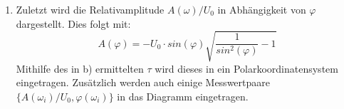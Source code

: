 \begin{enumerate}
       \item Zuletzt wird die Relativamplitude $A(\omega) / U_0$ in Abhängigkeit von $\varphi$ dargestellt.
       Dies folgt mit:
       \begin{equation}
         A(\varphi) = -U_0\cdot sin(\varphi)\sqrt{\frac{1}{sin^2(\varphi)}-1}
       \end{equation}
       Mithilfe des in b) ermittelten $\tau$ wird dieses in ein Polarkoordinatensystem eingetragen.
       Zusätzlich werden auch einige Messwertpaare $\{A(\omega_i)/U_0,\varphi(\omega_i)\}$ in das Diagramm
        eingetragen.

\end{enumerate}
